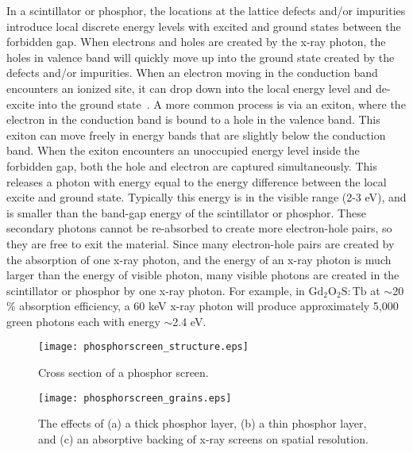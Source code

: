 In a scintillator or phosphor, the locations at the lattice defects and/or impurities introduce local discrete energy levels with excited and ground states between the forbidden gap.  When electrons and holes are created by the x-ray photon, the holes in valence band will quickly move up into the ground state created by the defects and/or impurities.  When an electron moving in the conduction band encounters an ionized site, it can drop down into the local energy level and de-excite into the ground state~\citep{Knoll2010}.  A more common process is via an exiton, where the electron in the conduction band is bound to a hole in the valence band.  This exiton can move freely in energy bands that are slightly below the conduction band.  When the exiton encounters an unoccupied energy level inside the forbidden gap, both the hole and electron are captured simultaneously.  This releases a photon with energy equal to the energy difference between the local excite and ground state.  Typically this energy is in the visible range (2-3 eV), and is smaller than the band-gap energy of the scintillator or phosphor.  These secondary photons cannot be re-absorbed to create more electron-hole pairs, so they are free to exit the material.  Since many electron-hole pairs are created by the absorption of one x-ray photon, and the energy of an x-ray photon is much larger than the energy of visible photon, many visible photons are created in the scintillator or phosphor by one x-ray photon.  For example, in $\mathrm{Gd_2O_2S:Tb}$ at $\sim$20$\%$ absorption efficiency, a 60 keV x-ray photon will produce approximately 5,000 green photons each with energy $\sim$2.4 eV.

\begin{figure}[ht]
	\texttt{[image: phosphorscreen\_structure.eps]}
	\caption[]{Cross section of a phosphor screen\footnotemark.}
\label{fig:phosphor_cross_section}
\end{figure}

\begin{figure}[ht]
\texttt{[image: phosphorscreen\_grains.eps]}
\caption{The effects of (a) a thick phosphor layer, (b) a thin phosphor layer, and (c) an absorptive backing of x-ray screens on spatial resolution.}
\label{fig:phosphor_effects}
\end{figure}

